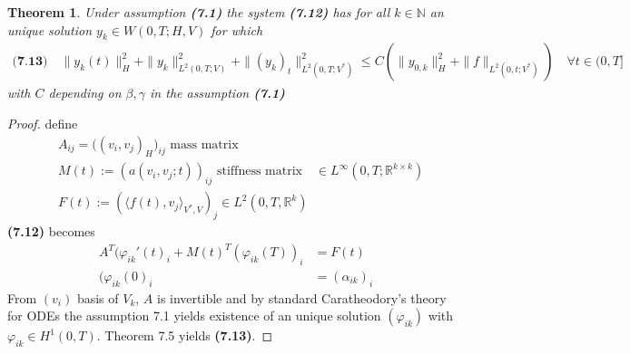 \documentclass[a4paper,11pt,fleqn]{book}
\newtheorem{theorem}{Theorem}[section]
\theoremstyle{definition}
\theoremstyle{remark}
\begin{document}
\begin{theorem}
	Under assumption \textbf{(7.1)} the system \textbf{(7.12)} has for all $k \in \mathbb{N}$ an unique solution $y_k \in W(0, T; H, V)$ for which
	\begin{align*}\textbf{(7.13)} \quad
		\|y_k(t)\|_H^2 + \|y_k\|_{L^2(0, T;V)}^2 + \|(y_k)_t\|^2_{L^2(0, T;V^*)} \le C (\|y_{0, k}\|_H^2 + \|f\|_{L^2(0, t;V^*)}) \quad \forall t \in (0, T]
	\end{align*}
	with $C$ depending on $\beta, \gamma$ in the assumption \textbf{(7.1)}
\end{theorem}
\begin{proof}
	define
	\begin{align*}
		&A_{ij} = \bigg((v_i, v_j)_H\bigg)_{ij} \text{ mass matrix}\\
		&M(t):= (a(v_i, v_j ; t))_{ij} \text{ stiffness matrix} \quad \in L^\infty(0, T; \mathbb{R}^{k \times k})\\
		&F(t):= (\langle f(t), v_j\rangle_{V^*, V})_j \in L^2(0, T, \mathbb{R}^k)
	\end{align*}
	\textbf{(7.12)} becomes
	\begin{align*}
		A^T(\varphi_{ik}'(t)_i + M(t)^T(\varphi_{ik}(T))_i &= F(t)\\
		(\varphi_{ik}(0)_i &= (\alpha_{ik})_i
	\end{align*}
	From $(v_i)$ basis of $V_k$, $A$ is invertible and by standard Caratheodory's theory for ODEs the assumption 7.1 yields existence of an unique solution $(\varphi_{ik})$ with $\varphi_{ik} \in H^1(0, T)$. Theorem 7.5 yields \textbf{(7.13)}.
\end{proof}
\end{document}
